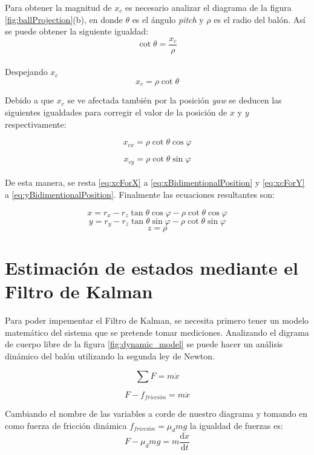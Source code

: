 Para obtener la magnitud de $x_c$ es necesario analizar el diagrama de la figura \ref{fig:ballProjection}(b), en donde $\theta$ es el ángulo \textit{pitch} y $\rho$ es el radio del balón. Así se puede obtener la siguiente igualdad:
\[\cot{\theta} = \frac{x_c}{\rho}\]\\

Despejando $x_c$
\[x_c = \rho \cot{\theta}\]

Debido a que $x_c$ se ve afectada también por la posición \textit{yaw} se deducen las siguientes igualdades para corregir el valor de la posición de $x$ y $y$ respectivamente:

\begin{equation}
\label{eq:xcForX}
x_{cx} = \rho \cot{\theta} \cos{\varphi}
\end{equation}

\begin{equation}
\label{eq:xcForY}
x_{cy} = \rho \cot{\theta} \sin{\varphi}
\end{equation}\\

De esta manera, se resta \ref{eq:xcForX}  a \ref{eq:xBidimentionalPosition} y \ref{eq:xcForY} a \ref{eq:yBidimentionalPosition}. Finalmente las ecuaciones resultantes son:

\[x = r_x - r_z \tan{\theta} \cos{\varphi} - \rho \cot{\theta} \cos{\varphi}\]
\[y = r_y - r_z \tan{\theta} \sin{\varphi} - \rho \cot{\theta} \sin{\varphi}\]
\[z = \rho \]


		
	\section{Estimación de estados mediante el Filtro de Kalman}
	Para poder impementar el Filtro de Kalman, se necesita primero tener un modelo matemático del sistema que se pretende tomar mediciones. Analizando el digrama de cuerpo libre de la figura \ref{fig:dynamic_model} se puede hacer un análisis dinámico del balón utilizando la segunda ley de Newton.

\begin{equation}
\sum F = m \ddot{x}
\label{eq:second_law}
\end{equation}

\begin{equation}
F-f_{fricción} = m \ddot{x}
\label{eq:equivalency_1}
\end{equation}

Cambiando el nombre de las variables a corde de nuestro diagrama y tomando en como fuerza de fricción dinámica $f_{fricción} = \mu_d m g $ la igualdad de fuerzas es:
\begin{equation}
F- \mu_d m g = m  \frac{\mathrm{d} \dot{x}}{\mathrm{d} t}
\label{eq:equivalency_2}
\end{equation}
	
